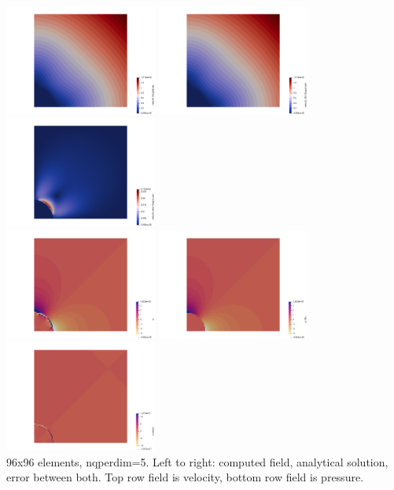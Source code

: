 \begin{center}
\includegraphics[width=5cm]{python_codes/fieldstone_80/results/solvi/vel}
\includegraphics[width=5cm]{python_codes/fieldstone_80/results/solvi/vel_th}
\includegraphics[width=5cm]{python_codes/fieldstone_80/results/solvi/vel_error}\\
\includegraphics[width=5cm]{python_codes/fieldstone_80/results/solvi/p}
\includegraphics[width=5cm]{python_codes/fieldstone_80/results/solvi/p_th}
\includegraphics[width=5cm]{python_codes/fieldstone_80/results/solvi/p_error}\\
{\captionfont 96x96 elements, nqperdim=5. Left to right: computed field, analytical solution, error between both.
Top row field is velocity, bottom row field is pressure.}
\end{center}


